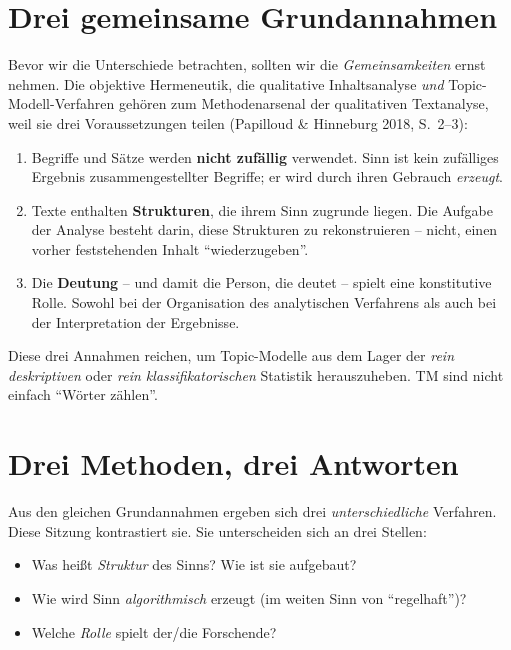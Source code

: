 \documentclass[a4paper,11pt]{article}
\begin{document}
\section{Drei gemeinsame Grundannahmen}

Bevor wir die Unterschiede betrachten, sollten wir die \emph{Gemein\-sam\-keiten}
ernst nehmen. Die objektive Hermeneutik, die qualitative
Inhaltsanalyse \emph{und} Topic-Modell-Verfahren gehören zum
Methodenarsenal der qualitativen Textanalyse, weil sie drei
Voraussetzungen teilen (Papilloud \& Hinneburg 2018, S.~2--3):

\begin{enumerate}
\item Begriffe und Sätze werden \textbf{nicht zufällig} verwendet.
Sinn ist kein zufälliges Ergebnis zusammengestellter Begriffe;
er wird durch ihren Gebrauch \emph{erzeugt}.

\item Texte enthalten \textbf{Strukturen}, die ihrem Sinn zugrunde
liegen. Die Aufgabe der Analyse besteht darin, diese Strukturen
zu rekonstruieren -- nicht, einen vorher feststehenden Inhalt
\enquote{wiederzugeben}.

\item Die \textbf{Deutung} -- und damit die Person, die deutet --
spielt eine konstitutive Rolle. Sowohl bei der Organisation des
analytischen Verfahrens als auch bei der Interpretation der Ergebnisse.
\end{enumerate}

Diese drei Annahmen reichen, um Topic-Modelle aus dem Lager der
\emph{rein deskriptiven} oder \emph{rein klassifikatorischen}
Statistik herauszuheben. TM sind nicht einfach \enquote{Wörter zählen}.

\section{Drei Methoden, drei Antworten}

Aus den gleichen Grundannahmen ergeben sich drei \emph{unterschiedliche}
Verfahren. Diese Sitzung kontrastiert sie. Sie unterscheiden sich an
drei Stellen:

\begin{itemize}
\item Was heißt \emph{Struktur} des Sinns? Wie ist sie aufgebaut?
\item Wie wird Sinn \emph{algorithmisch} erzeugt (im weiten Sinn von
\enquote{regelhaft})?
\item Welche \emph{Rolle} spielt der/die Forschende?
\end{itemize}
\end{document}
